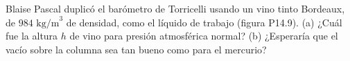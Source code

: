 \item Blaise Pascal duplicó el barómetro de Torricelli usando un vino tinto Bordeaux, de $984 \text{ kg/m}^3$ de densidad, como el líquido de trabajo (figura P14.9). (a) ¿Cuál fue la altura $h$ de vino para presión atmosférica normal? (b) ¿Esperaría que el vacío sobre la columna sea tan bueno como para el mercurio?
